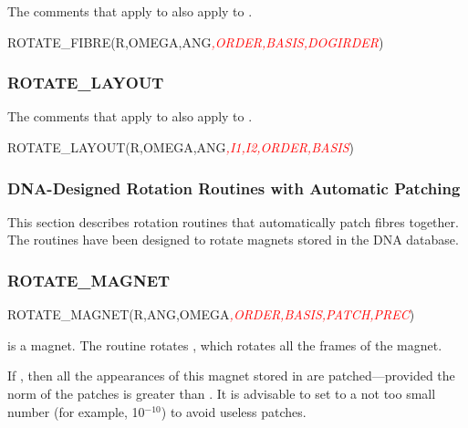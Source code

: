 %
The comments that apply to  also apply to
.

\begin{ptccode}
ROTATE_FIBRE(R,OMEGA,ANG\textit{\textcolor{red}{,ORDER,BASIS,DOGIRDER}})
\end{ptccode}


\subsubsection*{ROTATE\_LAYOUT}

%
The comments that apply to  also apply to
.

\begin{ptccode}
ROTATE_LAYOUT(R,OMEGA,ANG\textit{\textcolor{red}{,I1,I2,ORDER,BASIS}})
\end{ptccode}


\subsubsection{DNA-Designed Rotation Routines with Automatic Patching}

%
This section describes rotation routines that automatically patch fibres together.
The routines have been designed to rotate magnets stored in the DNA database.


\subsubsection*{ROTATE\_MAGNET}

%
\begin{ptccode}
ROTATE_MAGNET(R,ANG,OMEGA\textit{\textcolor{red}{,ORDER,BASIS,PATCH,PREC}})
\end{ptccode}

 is a magnet. The routine rotates , which rotates
all the frames of the magnet.

If , then all the appearances of this magnet stored in
 are patched---provided the norm of the patches is greater than
. It is advisable to set  to a not too small number
(for example, 10$^{-10}$) to avoid useless patches.

